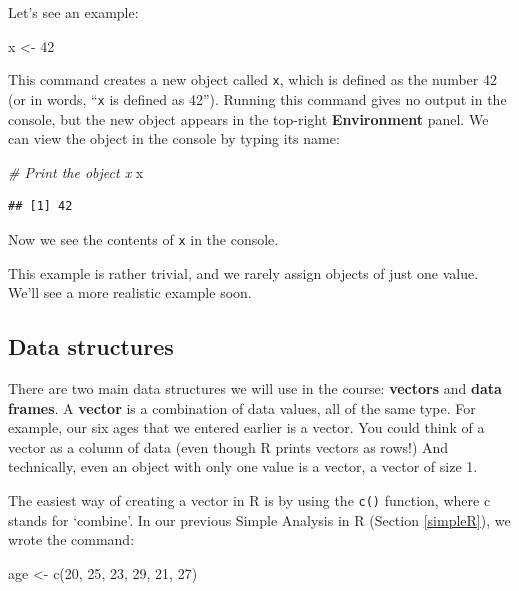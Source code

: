 \documentclass[
]{memoir}
\newenvironment{Shaded}{\begin{snugshade}}{\end{snugshade}}
\newcommand{\CommentTok}[1]{\textcolor[rgb]{0.56,0.35,0.01}{\textit{#1}}}
\newcommand{\DecValTok}[1]{\textcolor[rgb]{0.00,0.00,0.81}{#1}}
\newcommand{\FunctionTok}[1]{\textcolor[rgb]{0.00,0.00,0.00}{#1}}
\newcommand{\NormalTok}[1]{#1}
\newcommand{\OtherTok}[1]{\textcolor[rgb]{0.56,0.35,0.01}{#1}}
\begin{document}
Let's see an example:

\begin{Shaded}
\begin{Highlighting}[]
\NormalTok{x }\OtherTok{\textless{}{-}} \DecValTok{42}
\end{Highlighting}
\end{Shaded}

This command creates a new object called \texttt{x}, which is defined as the number 42 (or in words, ``\texttt{x} is defined as 42''). Running this command gives no output in the console, but the new object appears in the top-right \textbf{Environment} panel. We can view the object in the console by typing its name:

\begin{Shaded}
\begin{Highlighting}[]
\CommentTok{\# Print the object x}
\NormalTok{x}
\end{Highlighting}
\end{Shaded}

\begin{verbatim}
## [1] 42
\end{verbatim}

Now we see the contents of \texttt{x} in the console.

This example is rather trivial, and we rarely assign objects of just one value. We'll see a more realistic example soon.

\hypertarget{data-structures}{%
\subsection{Data structures}\label{data-structures}}

There are two main data structures we will use in the course: \textbf{vectors} and \textbf{data frames}. A \textbf{vector} is a combination of data values, all of the same type. For example, our six ages that we entered earlier is a vector. You could think of a vector as a column of data (even though R prints vectors as rows!) And technically, even an object with only one value is a vector, a vector of size 1.

The easiest way of creating a vector in R is by using the \texttt{c()} function, where c stands for `combine'. In our previous Simple Analysis in R (Section \ref{simpleR}), we wrote the command:

\begin{Shaded}
\begin{Highlighting}[]
\NormalTok{age }\OtherTok{\textless{}{-}} \FunctionTok{c}\NormalTok{(}\DecValTok{20}\NormalTok{, }\DecValTok{25}\NormalTok{, }\DecValTok{23}\NormalTok{, }\DecValTok{29}\NormalTok{, }\DecValTok{21}\NormalTok{, }\DecValTok{27}\NormalTok{)}
\end{Highlighting}
\end{Shaded}
\end{document}
